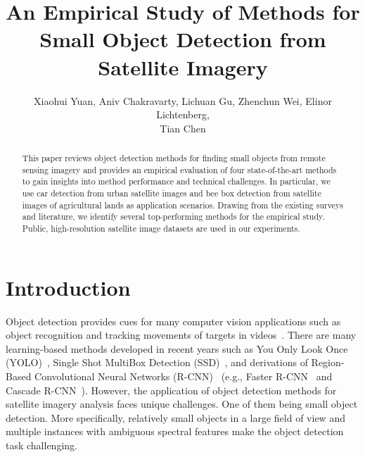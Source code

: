 \documentclass{article}
\title{An Empirical Study of Methods for Small Object Detection from Satellite Imagery}
\author{Xiaohui Yuan, Aniv Chakravarty, Lichuan Gu, Zhenchun Wei, Elinor Lichtenberg, \\Tian Chen}
\date{}
\begin{document}
\maketitle
\begin{abstract}
This paper reviews object detection methods for finding small objects from remote sensing imagery and provides an empirical evaluation of four state-of-the-art methods to gain insights into method performance and technical challenges. In particular, we use car detection from urban satellite images and bee box detection from satellite images of agricultural lands as application scenarios. Drawing from the existing surveys and literature, we identify several top-performing methods for the empirical study. Public, high-resolution satellite image datasets are used in our experiments.
\end{abstract}





\section{Introduction}
Object detection provides cues for many computer vision applications such as object recognition and tracking movements of targets in videos~\cite{2021Yuan,2017Zhou,2011Yuan}. There are many learning-based methods developed in recent years such as You Only Look Once (YOLO)~\cite{2016Redmon}, Single Shot MultiBox Detection (SSD)~\cite{2016Liu}, and derivations of Region-Based Convolutional Neural Networks (R-CNN)~\cite{2014Ross} (e.g., Faster R-CNN~\cite{2016Shaoqing} and Cascade R-CNN~\cite{2018Cai}). However, the application of object detection methods for satellite imagery analysis faces unique challenges. One of them being small object detection. More specifically, relatively small objects in a large field of view and multiple instances with ambiguous spectral features make the object detection task challenging. 
\end{document}
